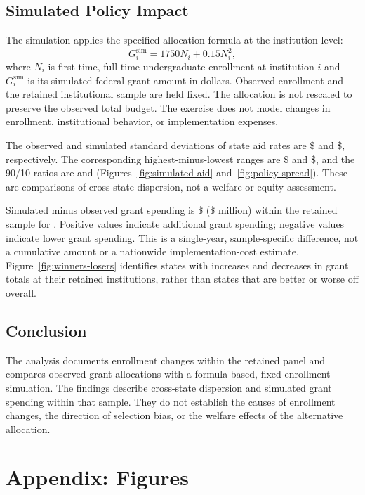 \documentclass[12pt]{article}
\begin{document}
\subsection*{Simulated Policy Impact}
The simulation applies the specified allocation formula at the institution
level:
\[
    G_i^{\mathrm{sim}} = 1750N_i + 0.15N_i^2,
\]
where $N_i$ is first-time, full-time undergraduate enrollment at institution
$i$ and $G_i^{\mathrm{sim}}$ is its simulated federal grant amount in dollars.
Observed \AidAcademicYear{} enrollment and the retained institutional sample
are held fixed. The allocation is not rescaled to preserve the observed total
budget. The exercise does not model changes in enrollment, institutional
behavior, or implementation expenses.

The observed and simulated standard deviations of state aid rates are
\$\CurrentAidSD{} and \$\SimulatedAidSD{}, respectively. The corresponding
highest-minus-lowest ranges are \$\CurrentAidRange{} and
\$\SimulatedAidRange{}, and the 90/10 ratios are \CurrentAidRatio{} and
\SimulatedAidRatio{} (Figures~\ref{fig:simulated-aid}
and~\ref{fig:policy-spread}). These are comparisons of cross-state dispersion,
not a welfare or equity assessment.

Simulated minus observed grant spending is \$\BudgetChangeDollars{}
(\$\BudgetChangeMillions{} million) within the retained sample for
\AidAcademicYear{}. Positive values indicate additional grant spending;
negative values indicate lower grant spending. This is a single-year,
sample-specific difference, not a cumulative amount or a nationwide
implementation-cost estimate. Figure~\ref{fig:winners-losers} identifies
states with increases and decreases in grant totals at their retained
institutions, rather than states that are better or worse off overall.

\subsection*{Conclusion}
The analysis documents enrollment changes within the retained panel and
compares observed grant allocations with a formula-based, fixed-enrollment
simulation. The findings describe cross-state dispersion and simulated grant
spending within that sample. They do not establish the causes of enrollment
changes, the direction of selection bias, or the welfare effects of the
alternative allocation.

\clearpage
\section*{Appendix: Figures}
\end{document}
